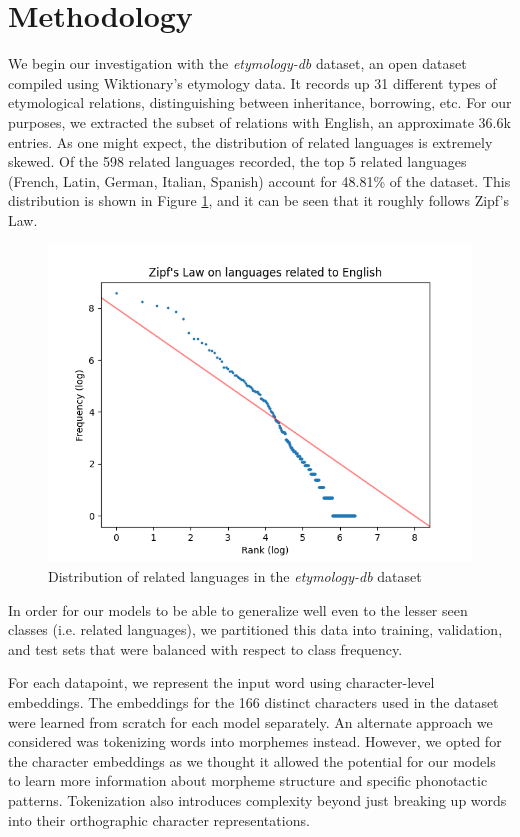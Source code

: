 \documentclass[11pt]{article}
\begin{document}
	\section{Methodology} \label{sec:meth}
	
	We begin our investigation with the \textit{etymology-db} \cite{etymologydb} dataset, an open dataset compiled using Wiktionary's etymology data. It records up 31 different types of etymological relations, distinguishing between inheritance, borrowing, etc. For our purposes, we extracted the subset of relations with English, an approximate 36.6k entries. As one might expect, the distribution of related languages is extremely skewed. Of the 598 related languages recorded, the top 5 related languages (French, Latin, German, Italian, Spanish) account for 48.81\% of the dataset. This distribution is shown in Figure \ref{fig:zipf}, and it can be seen that it roughly follows Zipf's Law.
	\begin{figure}
		\centering
		\includegraphics[scale=0.5]{zipf}
		\caption{Distribution of related languages in the \textit{etymology-db} dataset}
		\label{fig:zipf}
	\end{figure}
	In order for our models to be able to generalize well even to the lesser seen classes (i.e. related languages), we partitioned this data into training, validation, and test sets that were balanced with respect to class frequency.
	
	For each datapoint, we represent the input word using character-level embeddings. The embeddings for the 166 distinct characters used in the dataset were learned from scratch for each model separately. An alternate approach we considered was tokenizing words into morphemes instead. However, we opted for the character embeddings as we thought it allowed the potential for our models to learn more information about morpheme structure and specific phonotactic patterns. Tokenization also introduces complexity beyond just breaking up words into their orthographic character representations.
	
\end{document}
